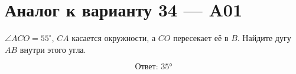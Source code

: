 


\section*{Аналог к варианту 34 — A01}
\(\angle ACO=55^\circ\), \(CA\) касается окружности, а \(CO\) пересекает её в \(B\). Найдите дугу \(AB\) внутри этого угла.
\begin{center}\figTangentSecantReverse\end{center}
\[\boxed{\text{Ответ: }35°}\]

